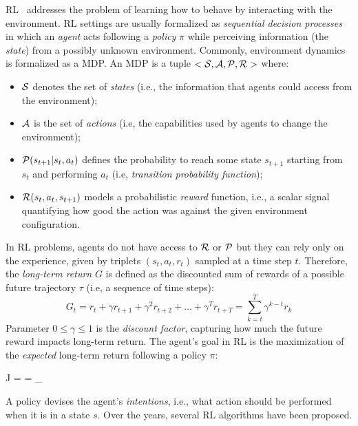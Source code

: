 \ac{RL}~\cite{sutton2018reinforcement-learning} addresses 
 the problem of learning how to behave 
 by interacting with the environment.
\ac{RL} settings are usually formalized 
 as \emph{sequential decision processes} in which an \emph{agent} acts 
following a \emph{policy} $\pi$ while perceiving information (the \emph{state})
from a possibly unknown environment. 
%
Commonly, environment dynamics is formalized as a \ac{MDP}.
%
An \ac{MDP} is a tuple $<\mathcal{S}, \mathcal{A}, \mathcal{P}, \mathcal{R}>$ where:
\begin{itemize}
  \item $\mathcal{S}$ denotes the set of \emph{states} 
   (i.e., the information that agents could access from the environment);
  \item $\mathcal{A}$ is the set of \emph{actions} 
   (i.e, the capabilities used by agents to change the environment);
  \item $\mathcal{P}(s_{t + 1} | s_t, a_t)$ defines the probability 
    to reach some state $s_{t + 1}$ starting from $s_t$ 
    and performing $a_t$ (i.e, \emph{transition probability function});
  \item $\mathcal{R}(s_t, a_t, s_{t+1})$ models a probabilistic \emph{reward} function, i.e., a scalar signal quantifying how good the action was against the given environment configuration.
\end{itemize}
%
In \ac{RL} problems, 
 agents do not have access to $\mathcal{R}$ or $\mathcal{P}$ 
 but they can rely only on the experience,
 given by triplets $(s_t, a_t, r_t)$ 
 sampled at a time step $t$. 
Therefore, the \emph{long-term return} $G$ 
 is defined as the discounted sum of rewards 
 of a possible future trajectory $\tau$ 
 (i.e, a sequence of time steps):
\begin{equation}
G_{t} = r_t + \gamma r_{t + 1} + \gamma^2 r_{t + 2} + \dots + \gamma^T r_{t + T} = \sum_{k = t}^T \gamma^{k-t} r_k
\end{equation}
Parameter $0 \leq \gamma \leq 1$ is the \emph{discount factor}, 
 capturing how much the future reward impacts long-term return.
The agent's goal in \ac{RL} is the maximization 
 of the \emph{expected} long-term return following a policy $\pi$:
\begin{iequation}
J = \big[ G_t \big] = \RE_\pi \big[ \sum_{k = t}^T \gamma^{t-k} r_k \big] 
\end{iequation}
A policy devises the agent's \emph{intentions}, 
 i.e., what action should be performed when it is in a state $s$.
%
Over the years, several \ac{RL} algorithms have been proposed. 
